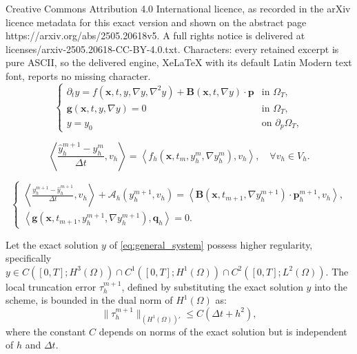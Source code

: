 \documentclass[10pt,a4paper]{amsart}
\begin{document}
Creative Commons Attribution 4.0 International licence, as recorded in the arXiv licence metadata for this exact version and shown on the abstract page https://arxiv.org/abs/2505.20618v5. A full rights notice is delivered at licenses/arxiv-2505.20618-CC-BY-4.0.txt. Characters: every retained excerpt is pure ASCII, so the delivered engine, XeLaTeX with its default Latin Modern text font, reports no missing character.
\begin{equation}
\label{eq:general_system}
\begin{cases}
\partial_t y = f(\bm{x}, t, y, \nabla y, \nabla^2 y) + \bm{B}(\bm{x}, t, \nabla y) \cdot \bm{p} & \text{in } \Omega_T, \\
\bm{g}(\bm{x}, t, y, \nabla y) = 0 & \text{in } \Omega_T, \\
y = y_0 & \text{on } \partial_p \Omega_T,
\end{cases}
\end{equation}

    \begin{equation}
    \label{eq:predictor_step}
        \left\langle \frac{\hat{y}_h^{m+1} - y_h^m}{\Delta t}, v_h \right\rangle = \left\langle f_h(\bm{x}, t_m, y_h^m, \nabla y_h^m), v_h \right\rangle, \quad \forall v_h \in V_h.
    \end{equation}

    \begin{equation}
    \label{eq:corrector_step}
    \begin{cases}
        \left\langle \frac{y_h^{m+1} - \hat{y}_h^{m+1}}{\Delta t}, v_h \right\rangle + \mathcal{A}_h(y_h^{m+1}, v_h) = \left\langle \bm{B}(\bm{x}, t_{m+1}, \nabla y_h^{m+1}) \cdot \bm{p}_h^{m+1}, v_h \right\rangle, \\
        \left\langle \bm{g}(\bm{x}, t_{m+1}, y_h^{m+1}, \nabla y_h^{m+1}), \bm{q}_h \right\rangle = 0.
    \end{cases}
    \end{equation}

\begin{prop}
\label{prop:strong_truncation_error}
Let the exact solution $y$ of \eqref{eq:general_system} possess higher regularity, specifically $y \in C([0,T]; H^{3}(\Omega)) \cap C^1([0,T]; H^1(\Omega)) \cap C^2([0,T]; L^2(\Omega))$. The local truncation error $\tau_h^{m+1}$, defined by substituting the exact solution $y$ into the scheme, is bounded in the dual norm of $H^1(\Omega)$ as:
$$ \| \tau_h^{m+1} \|_{(H^1(\Omega))'} \leq C (\Delta t + h^2), $$
where the constant $C$ depends on norms of the exact solution but is independent of $h$ and $\Delta t$.
\end{prop}
\end{document}
